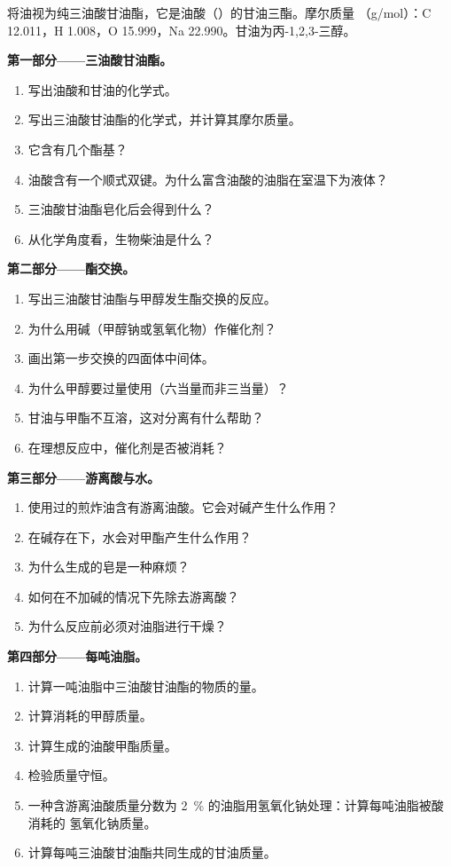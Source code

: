 \begin{problem}
\label{pb:b2:acyl-substitution:1}
将油视为纯三油酸甘油酯，它是油酸（）的甘油三酯。摩尔质量
（\unit{g/mol}）：C 12.011，H 1.008，O 15.999，Na 22.990。甘油为丙-1,2,3-三醇。

\medskip
\noindent\textbf{第一部分——三油酸甘油酯。}
\begin{enumerate}
  \item 写出油酸和甘油的化学式。
  \item 写出三油酸甘油酯的化学式，并计算其摩尔质量。
  \item 它含有几个酯基？
  \item 油酸含有一个顺式双键。为什么富含油酸的油脂在室温下为液体？
  \item 三油酸甘油酯皂化后会得到什么？
  \item 从化学角度看，生物柴油是什么？
\end{enumerate}

\medskip
\noindent\textbf{第二部分——酯交换。}
\begin{enumerate}[resume]
  \item 写出三油酸甘油酯与甲醇发生酯交换的反应。
  \item 为什么用碱（甲醇钠或氢氧化物）作催化剂？
  \item 画出第一步交换的四面体中间体。
  \item 为什么甲醇要过量使用（六当量而非三当量）？
  \item 甘油与甲酯不互溶，这对分离有什么帮助？
  \item 在理想反应中，催化剂是否被消耗？
\end{enumerate}

\medskip
\noindent\textbf{第三部分——游离酸与水。}
\begin{enumerate}[resume]
  \item 使用过的煎炸油含有游离油酸。它会对碱产生什么作用？
  \item 在碱存在下，水会对甲酯产生什么作用？
  \item 为什么生成的皂是一种麻烦？
  \item 如何在不加碱的情况下先除去游离酸？
  \item 为什么反应前必须对油脂进行干燥？
\end{enumerate}

\medskip
\noindent\textbf{第四部分——每吨油脂。}
\begin{enumerate}[resume]
  \item 计算一吨油脂中三油酸甘油酯的物质的量。
  \item 计算消耗的甲醇质量。
  \item 计算生成的油酸甲酯质量。
  \item 检验质量守恒。
  \item 一种含游离油酸质量分数为 2~\% 的油脂用氢氧化钠处理：计算每吨油脂被酸消耗的
        氢氧化钠质量。
  \item 计算每吨三油酸甘油酯共同生成的甘油质量。
\end{enumerate}
\end{problem}
